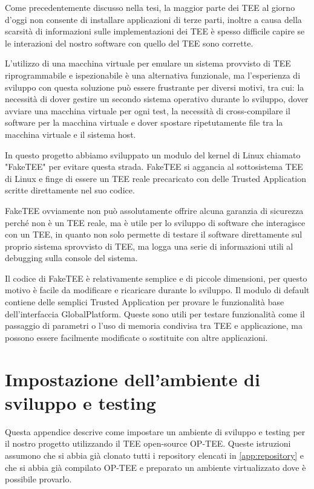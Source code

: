 \documentclass[12pt,italian]{report}
\begin{document}
Come precedentemente discusso nella tesi, la maggior parte dei TEE al giorno
d'oggi non consente di installare applicazioni di terze parti, inoltre
a causa della scarsità di informazioni sulle implementazioni dei TEE
è spesso difficile capire se le interazioni del nostro software con quello
del TEE sono corrette.

L'utilizzo di una macchina virtuale per emulare un sistema provvisto di TEE
riprogrammabile e ispezionabile è una alternativa funzionale, ma
l'esperienza di sviluppo con questa soluzione può essere frustrante per
diversi motivi, tra cui: la necessità di dover gestire un secondo sistema
operativo durante lo sviluppo, dover avviare una macchina virtuale per ogni
test, la necessità di cross-compilare il software per la macchina virtuale
e dover spostare ripetutamente file tra la macchina virtuale e il sistema
host.

In questo progetto abbiamo sviluppato un modulo del kernel di Linux chiamato
"FakeTEE" per evitare questa strada. FakeTEE si aggancia al sottosistema TEE
di Linux e finge di essere un TEE reale precaricato con delle
Trusted Application scritte direttamente nel suo codice.

FakeTEE ovviamente non può assolutamente offrire alcuna garanzia di sicurezza
perché non è un TEE reale, ma è utile per lo sviluppo di software che
interagisce con un TEE, in quanto non solo permette di testare il software
direttamente sul proprio sistema sprovvisto di TEE, ma logga una serie di
informazioni utili al debugging sulla console del sistema.

Il codice di FakeTEE è relativamente semplice e di piccole dimensioni, per
questo motivo è facile da modificare e ricaricare durante lo sviluppo.
Il modulo di default contiene delle semplici Trusted Application per provare
le funzionalità base dell'interfaccia GlobalPlatform.
Queste sono utili per testare funzionalità come il passaggio di parametri o
l'uso di memoria condivisa tra TEE e applicazione, ma possono essere
facilmente modificate o sostituite con altre applicazioni.

\chapter{Impostazione dell'ambiente di sviluppo e testing}
\label{app:impostazione-ambiente-sviluppo-testing}
Questa appendice descrive come impostare un ambiente di sviluppo e testing
per il nostro progetto utilizzando il TEE open-source OP-TEE.
Queste istruzioni assumono che si abbia già clonato tutti i repository
elencati in \ref{app:repository} e che si abbia già compilato OP-TEE e
preparato un ambiente virtualizzato dove è possibile provarlo.
\end{document}
